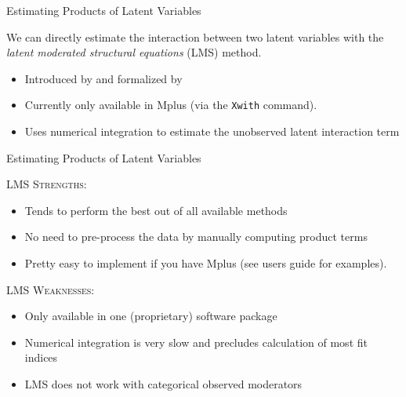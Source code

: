 \documentclass{beamer}
\newcommand{\va}[0]{\vspace{12pt}}
\newcommand{\vb}[0]{\vspace{6pt}}
\begin{document}
\begin{frame}{Estimating Products of Latent Variables}
  
  We can directly estimate the interaction between two latent
  variables with the \emph{latent moderated structural equations}
  (LMS) method.
  \va
  \begin{itemize}
  \item Introduced by \citet{kleinEtAl:1997} and formalized by
    \citet{kleinMoosbrugger:2000} 
    \vb
  \item Currently only available in Mplus (via the \texttt{Xwith}
    command).
    \vb
  \item Uses numerical integration to estimate the unobserved latent
    interaction term
  \end{itemize}
  
\end{frame}


\begin{frame}{Estimating Products of Latent Variables}
  
  \textsc{LMS Strengths:}
  \begin{itemize}
    \item Tends to perform the best out of all available methods
      \vb
    \item No need to pre-process the data by manually computing
      product terms
      \vb
    \item Pretty easy to implement if you have Mplus (see users guide
      for examples).
  \end{itemize}
  \va
  \textsc{LMS Weaknesses:}
  \begin{itemize}
  \item Only available in one (proprietary) software package
    \vb
  \item Numerical integration is very slow and precludes calculation
    of most fit indices
    \vb
  \item LMS does not work with categorical observed moderators
  \end{itemize}
  
\end{frame}
\end{document}

